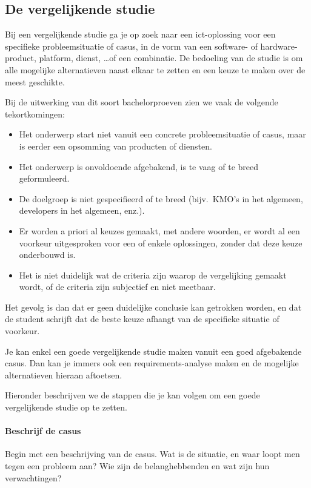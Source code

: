 \subsection{De vergelijkende studie}%
\label{ssec:vergelijkende-studie}

Bij een vergelijkende studie ga je op zoek naar een ict-oplossing voor een specifieke probleemsituatie of casus, in de vorm van een software- of hardware-product, platform, dienst, \ldots of een combinatie. De bedoeling van de studie is om alle mogelijke alternatieven naast elkaar te zetten en een keuze te maken over de meest geschikte.

Bij de uitwerking van dit soort bachelorproeven zien we vaak de volgende tekortkomingen:

\begin{itemize}
  \item Het onderwerp start niet vanuit een concrete probleemsituatie of casus, maar is eerder een opsomming van producten of diensten.
  \item Het onderwerp is onvoldoende afgebakend, is te vaag of te breed geformuleerd.
  \item De doelgroep is niet gespecifieerd of te breed (bijv.~KMO's in het algemeen, developers in het algemeen, enz.).
  \item Er worden a priori al keuzes gemaakt, met andere woorden, er wordt al een voorkeur uitgesproken voor een of enkele oplossingen, zonder dat deze keuze onderbouwd is.
  \item Het is niet duidelijk wat de criteria zijn waarop de vergelijking gemaakt wordt, of de criteria zijn subjectief en niet meetbaar.
\end{itemize}

Het gevolg is dan dat er geen duidelijke conclusie kan getrokken worden, en dat de student schrijft dat de beste keuze afhangt van de specifieke situatie of voorkeur.

Je kan enkel een goede vergelijkende studie maken vanuit een goed afgebakende casus. Dan kan je immers ook een requirements-analyse maken en de mogelijke alternatieven hieraan aftoetsen.

Hieronder beschrijven we de stappen die je kan volgen om een goede vergelijkende studie op te zetten.

\paragraph{Beschrijf de casus}%

Begin met een beschrijving van de casus. Wat is de situatie, en waar loopt men tegen een probleem aan? Wie zijn de belanghebbenden en wat zijn hun verwachtingen?

